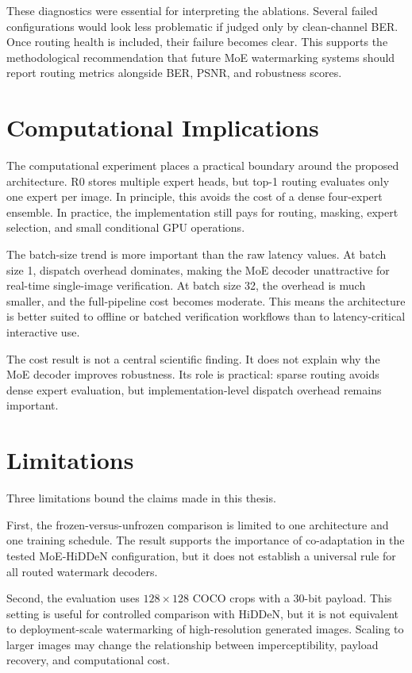 ﻿\documentclass[12pt, a4paper, twoside]{report}
\numberwithin{equation}{chapter}
\begin{document}
These diagnostics were essential for interpreting the ablations. Several failed configurations would look less problematic if judged only by clean-channel BER. Once routing health is included, their failure becomes clear. This supports the methodological recommendation that future MoE watermarking systems should report routing metrics alongside BER, PSNR, and robustness scores.

\section{Computational Implications}

The computational experiment places a practical boundary around the proposed architecture. R0 stores multiple expert heads, but top-1 routing evaluates only one expert per image. In principle, this avoids the cost of a dense four-expert ensemble. In practice, the implementation still pays for routing, masking, expert selection, and small conditional GPU operations.

The batch-size trend is more important than the raw latency values. At batch size 1, dispatch overhead dominates, making the MoE decoder unattractive for real-time single-image verification. At batch size 32, the overhead is much smaller, and the full-pipeline cost becomes moderate. This means the architecture is better suited to offline or batched verification workflows than to latency-critical interactive use.

The cost result is not a central scientific finding. It does not explain why the MoE decoder improves robustness. Its role is practical: sparse routing avoids dense expert evaluation, but implementation-level dispatch overhead remains important.

\section{Limitations}

Three limitations bound the claims made in this thesis.

First, the frozen-versus-unfrozen comparison is limited to one architecture and one training schedule. The result supports the importance of co-adaptation in the tested MoE-HiDDeN configuration, but it does not establish a universal rule for all routed watermark decoders.

Second, the evaluation uses $128\times128$ COCO crops with a 30-bit payload. This setting is useful for controlled comparison with HiDDeN, but it is not equivalent to deployment-scale watermarking of high-resolution generated images. Scaling to larger images may change the relationship between imperceptibility, payload recovery, and computational cost.
\end{document}
